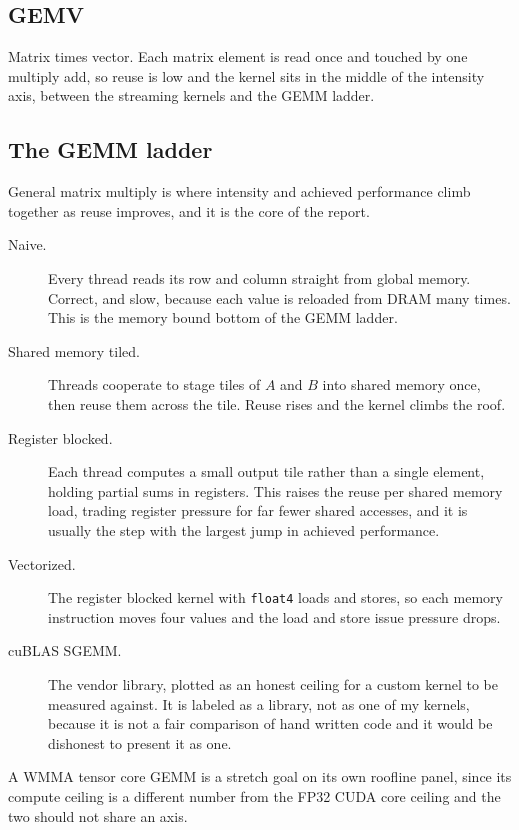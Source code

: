 \subsection{GEMV}

Matrix times vector. Each matrix element is read once and touched by one
multiply add, so reuse is low and the kernel sits in the middle of the intensity
axis, between the streaming kernels and the GEMM ladder.

\subsection{The GEMM ladder}

General matrix multiply is where intensity and achieved performance climb
together as reuse improves, and it is the core of the report.

\begin{description}
  \item[Naive.] Every thread reads its row and column straight from global
    memory. Correct, and slow, because each value is reloaded from DRAM many
    times. This is the memory bound bottom of the GEMM ladder.
  \item[Shared memory tiled.] Threads cooperate to stage tiles of $A$ and $B$
    into shared memory once, then reuse them across the tile. Reuse rises and the
    kernel climbs the roof.
  \item[Register blocked.] Each thread computes a small output tile rather than a
    single element, holding partial sums in registers. This raises the reuse per
    shared memory load, trading register pressure for far fewer shared accesses,
    and it is usually the step with the largest jump in achieved performance.
  \item[Vectorized.] The register blocked kernel with \texttt{float4} loads and
    stores, so each memory instruction moves four values and the load and store
    issue pressure drops.
  \item[cuBLAS SGEMM.] The vendor library, plotted as an honest ceiling for a
    custom kernel to be measured against. It is labeled as a library, not as one
    of my kernels, because it is not a fair comparison of hand written code and
    it would be dishonest to present it as one.
\end{description}

A WMMA tensor core GEMM is a stretch goal on its own roofline panel, since its
compute ceiling is a different number from the FP32 CUDA core ceiling and the two
should not share an axis.
